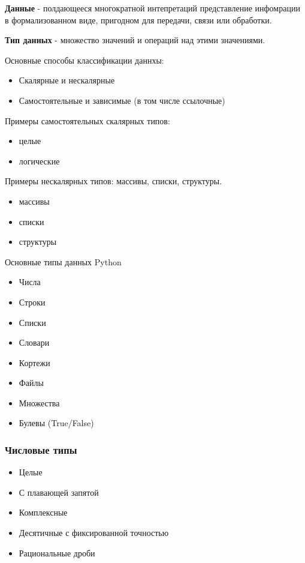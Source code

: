 \begin{definition}
  \textbf{Данные} - полдающееся многократной интепретаций представление инфомрации в формализованном виде, пригодном для передачи, связи или обработки.
\end{definition}

\begin{definition}
  \textbf{Тип данных} - множество значений и операций над этими значениями.
\end{definition}

Основные способы классификации даннхы:
\begin{itemize}
  \item Скалярные и нескалярные
  \item Самостоятельные и зависимые (в том числе ссылочные)
\end{itemize}

Примеры самостоятельных скалярных типов: 
\begin{itemize}
  \item целые
  \item логические
\end{itemize}

Примеры нескалярных типов: массивы, списки, структуры.
\begin{itemize}
  \item массивы
  \item списки
  \item структуры
\end{itemize}

Основные типы данных Python
\begin{itemize}
  \item Числа
  \item Строки
  \item Списки
  \item Словари
  \item Кортежи
  \item Файлы
  \item Множества
  \item Булевы (True/False)
\end{itemize}

\subsubsection{Числовые типы}
\begin{itemize}
  \item Целые
  \item С плавающей запятой
  \item Комплексные
  \item Десятичные с фиксированной точностью
  \item Рациональные дроби
\end{itemize}


